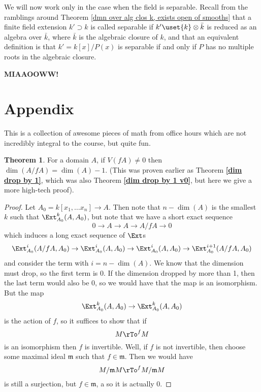 \documentclass[12 pt]{article}
\theoremstyle{definition}
\newtheorem{theorem}{Theorem}[section]
\begin{document}
We will now work only in the case when the field is separable. Recall from the ramblings around Theorem \ref{dmn over alg clos k, exists open of smooths} that a finite field extension $k' \supset k$ is called separable if $k' \uset{k} \otimes \bar{k}$ is reduced as an algebra over $\bar{k}$, where $\bar{k}$ is the algebraic closure of $k$, and that an equivalent definition is that $k'=k[x]/P(x)$ is separable if and only if $P$ has no multiple roots in the algebraic closure.


\textcolor[rgb]{1.00,0.00,0.00}{\textbf{MIAAOOWW!}}






\newpage








\section{Appendix}

This is a collection of awesome pieces of math from office hours which are not incredibly integral to the course, but quite fun.


\begin{theorem} For a domain $A$, if $V(fA) \neq 0$ then $\dim(A/fA)=\dim(A)-1$. (This was proven earlier as Theorem \textbf{\ref{dim drop by 1}}, which was also Theorem \textbf{\ref{dim drop by 1 v0}}, but here we give a more high-tech proof).
\end{theorem}
\begin{proof}  Let $A_0=k[x_1, \ldots x_n] \to A$. Then note that $n-\dim(A)$ is the smallest $k$ such that $\Ext_{A_0}^k(A,A_0)$, but note that we have a short exact sequence
\[0 \to A \to A \to A/fA \to 0\]
which induces a long exact sequence of $\Ext$s
\[\Ext^{i}_{A_0}(A/fA,A_0) \to \Ext^i_{A_0}(A, A_0) \to \Ext^i_{A_0}(A,A_0) \to \Ext^{i+1}_{A_0}(A/fA, A_0)\]
and consider the term with $i=n-\dim(A)$. We know that the dimension must drop, so the first term is 0. If the dimension dropped by more than 1, then the last term would also be 0, so we would have that the map is an isomorphism. But the map
\[\Ext^k_{A_0}(A,A_0) \to \Ext^k_{A_0}(A,A_0)\]
is the action of $f$, so it suffices to show that if
\[M \rTo^f M\]
is an isomorphism then $f$ is invertible. Well, if $f$ is not invertible, then choose some maximal ideal $\mathfrak{m}$ such that $f \in \mathfrak{m}$. Then we would have
\[M/\mathfrak{m} M \rTo^f M/\mathfrak{m} M\]
is still a surjection, but $f \in \mathfrak{m}$, a so it is actually 0.
\end{proof}
\end{document}
